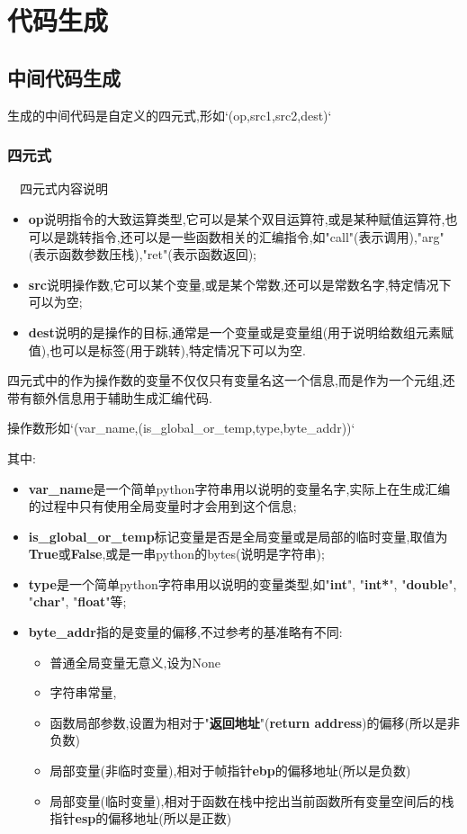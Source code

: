 \documentclass{article}
\begin{document}
\section{代码生成}

\subsection{中间代码生成}

生成的中间代码是自定义的四元式,形如`(op,src1,src2,dest)`

\subsubsection{四元式}

\quad\ \ 四元式内容说明

\begin{itemize}
	\item  \textbf{op}说明指令的大致运算类型,它可以是某个双目运算符,或是某种赋值运算符,也可以是跳转指令,还可以是一些函数相关的汇编指令,如"call"(表示调用),"arg"(表示函数参数压栈),"ret"(表示函数返回);
	\item \textbf{src}说明操作数,它可以某个变量,或是某个常数,还可以是常数名字,特定情况下可以为空; 
	\item \textbf{dest}说明的是操作的目标,通常是一个变量或是变量组(用于说明给数组元素赋值),也可以是标签(用于跳转),特定情况下可以为空.
\end{itemize}

四元式中的作为操作数的变量不仅仅只有变量名这一个信息,而是作为一个元组,还带有额外信息用于辅助生成汇编代码.

操作数形如`(var\_name,(is\_global\_or\_temp,type,byte\_addr))`

其中:

\begin{itemize}
\item  \textbf{var\_name}是一个简单python字符串用以说明的变量名字,实际上在生成汇编的过程中只有使用全局变量时才会用到这个信息;
\item   \textbf{is\_global\_or\_temp}标记变量是否是全局变量或是局部的临时变量,取值为\textbf{True}或\textbf{False},或是一串python的bytes(说明是字符串);
\item  \textbf{type}是一个简单python字符串用以说明的变量类型,如"\textbf{int}", "\textbf{int*}", "\textbf{double}", "\textbf{char}", "\textbf{float}"等;
\item  \textbf{byte\_addr}指的是变量的偏移,不过参考的基准略有不同:\begin{itemize}
				\item  普通全局变量无意义,设为None
				\item  字符串常量,
				\item  函数局部参数,设置为相对于"\textbf{返回地址}"(\textbf{return address})的偏移(所以是非负数)
				\item  局部变量(非临时变量),相对于帧指针\textbf{ebp}的偏移地址(所以是负数)
				\item  局部变量(临时变量),相对于函数在栈中挖出当前函数所有变量空间后的栈指针\textbf{esp}的偏移地址(所以是正数)
				\end{itemize}
\end{itemize}
\end{document}
